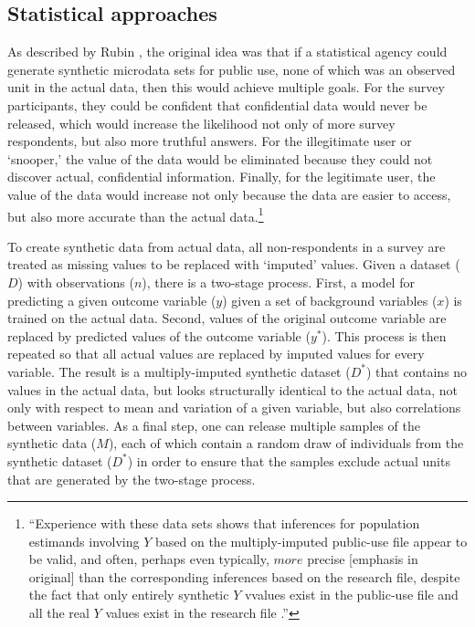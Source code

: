 \documentclass[runningheads]{llncs}
\begin{document}
\subsection{Statistical approaches}

As described by Rubin \cite{rubin1993statistical}, the original idea was that if a statistical agency could generate synthetic microdata sets for public use, none of which was an observed unit in the actual data, then this would achieve multiple goals.  For the survey participants, they could be confident that confidential data would never be released, which would increase the likelihood not only of more survey respondents, but also more truthful answers.  For the illegitimate user or `snooper,' the value of the data would be eliminated because they could not discover actual, confidential information.  Finally, for the legitimate user, the value of the data would increase not only because the data are easier to access, but also more accurate than the actual data.\footnote{``Experience with these data sets shows that inferences for population estimands involving $Y$ based on the multiply-imputed public-use file appear to be valid, and often, perhaps even typically, $more$ precise [emphasis in original] than the corresponding inferences based on the research file, despite the fact that only entirely synthetic $Y$ vvalues exist in the public-use file and all the real $Y$ values exist in the research file \citep[pg. 466]{rubin1993statistical}.''}  

To create synthetic data from actual data, all non-respondents in a survey are treated as missing values to be replaced with `imputed' values.  Given a dataset ($D$) with observations ($n$), there is a two-stage process.  First, a model for predicting a given outcome variable ($y$) given a set of background variables ($x$) is trained on the actual data.  Second, values of the original outcome variable are replaced by predicted values of the outcome variable ($y^*$).  This process is then repeated so that all actual values are replaced by imputed values for every variable.  The result is a multiply-imputed synthetic dataset ($D^*$) that contains no values in the actual data, but looks structurally identical to the actual data, not only with respect to mean and variation of a given variable, but also correlations between variables.  As a final step, one can release multiple samples of the synthetic data ($M$), each of which contain a random draw of individuals from the synthetic dataset ($D^*$) in order to ensure that the samples exclude actual units that are generated by the two-stage process.
\end{document}
